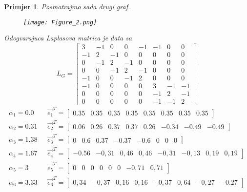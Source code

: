 \documentclass[11pt]{article}
\newtheorem{example}{Primjer}
\begin{document}
	
	\begin{example}
		Posmatrajmo sada drugi graf.
		\begin{figure}[h]
			\centering
			\texttt{[image: Figure\_2.png]}
		\end{figure}
		Odogvarajuca Laplasova matrica je data sa
		\[ 
		L_G =
		\begin{bmatrix}
		3 & -1 & 0 & 0 & -1 & -1 & 0 & 0 \\
		-1 & 2 & -1 & 0 & 0 & 0 & 0 & 0 \\
		0 & -1 & 2 & -1 & 0 & 0 & 0 & 0 \\
		0 & 0 & -1 & 2 & -1 & 0 & 0 & 0 \\
		-1 & 0 & 0 & -1 & 2 & 0 & 0 & 0 \\
		-1 & 0 & 0 & 0 & 0 & 3 & -1 & -1 \\
		0 & 0 & 0 & 0 & 0 & -1 & 2 & -1 \\
		0 & 0 & 0 & 0 & 0 & -1 & -1 & 2
		\end{bmatrix}
		\]
        \[
            \begin{split}
                \alpha_1=0.0 \text{      } & \vec{e_1}^T = \begin{bmatrix} 0.35  &   0.35  &  0.35  &  0.35  &  0.35  &  0.35  &  0.35  &  0.35      \end{bmatrix} \\ 
                \alpha_2=0.31 \text{     } & \vec{e_2}^T = \begin{bmatrix} 0.06  &   0.26  &  0.37  &  0.37  &  0.26  &  -0.34  &  -0.49  &  -0.49  \end{bmatrix} \\ 
                \alpha_3=1.38 \text{     } & \vec{e_3}^T = \begin{bmatrix} 0  &  0.6  &  0.37  &  -0.37  &  -0.6  &  0  &  0  &  0                  \end{bmatrix} \\
                \alpha_4=1.67 \text{     } & \vec{e_4}^T = \begin{bmatrix} -0.56  &  -0,31  &  0,46  &  0,46  &  -0,31  &  -0,13  &  0,19  &  0,19   \end{bmatrix} \\
                \alpha_5=3 \text{        } & \vec{e_5}^T = \begin{bmatrix} 0  &  0  &  0  &  0  &  0  &  0  & -0,71  &  0,71                         \end{bmatrix} \\
                \alpha_6=3.33 \text{     } & \vec{e_6}^T = \begin{bmatrix} 0,34  &  -0,37  &  0,16  &  0,16  &  -0,37  &  0,64  &  -0,27  &  -0.27   \end{bmatrix} \\

\end{split}\]
\end{example}
\end{document}
